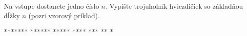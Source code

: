 




Na vstupe dostanete jedno číslo $n$. Vypíšte trojuholník hviezdičiek so základňou dĺžky $n$ (pozri
vzorový príklad). 

\vystup
*******
******
*****
****
***
**
*
\koniec


